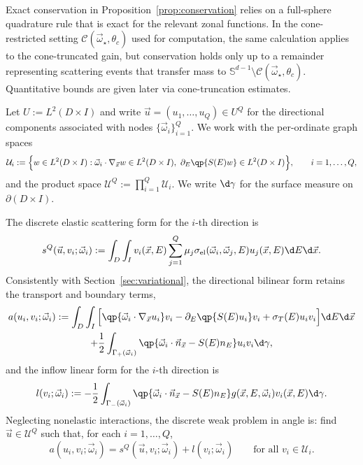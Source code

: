 \documentclass[final]{amsart}
\begin{document}
\begin{remark}
Exact conservation in Proposition~\ref{prop:conservation} relies on a
full-sphere quadrature rule that is exact for the relevant zonal
functions. In the cone-restricted setting
$\mathcal{C}(\vec{\omega}_\star,\theta_c)$ used for computation, the same
calculation applies to the cone-truncated gain, but conservation holds
only up to a remainder representing scattering events that transfer mass
to $\mathbb{S}^{d-1}\setminus\mathcal{C}(\vec{\omega}_\star,\theta_c)$.
Quantitative bounds are given later via cone-truncation estimates.
\end{remark}

Let $U:=L^2(D\times I)$ and write $\vec{u}=(u_1,\dots,u_Q)\in U^Q$ for
the directional components associated with nodes
$\{\vec{\omega}_i\}_{i=1}^Q$. We work with the per-ordinate graph
spaces
\[
  \mathcal{U}_i
  :=
  \Big\{ w\in L^2(D\times I) : 
  \vec{\omega}_i\cdot\nabla_{\vec x} w \in L^2(D\times I),
  \ \partial_E\qp{S(E)w}\in L^2(D\times I)\Big\},
  \qquad i=1,\dots,Q,
\]
and the product space $\mathcal{U}^Q:=\prod_{i=1}^Q \mathcal{U}_i$.
We write $\d\gamma$ for the surface measure on $\partial(D\times I)$.

The discrete elastic scattering form for the $i$-th direction is
\begin{equation}
  \label{eq:sQ-def}
  s^Q(\vec{u},v_i;\vec{\omega}_i)
  :=
  \int_D \int_I
  v_i(\vec{x},E)
  \sum_{j=1}^Q \mu_j 
  \sigma_{\mathrm{el}}(\vec{\omega}_i,\vec{\omega}_j,E) 
  u_j(\vec{x},E)
   \d E \d\vec{x}.
\end{equation}
Consistently with Section~\ref{sec:variational}, the directional
bilinear form retains the transport and boundary terms,
\begin{multline}
  \label{eq:aQ-def}
  a(u_i,v_i;\vec{\omega}_i)
  :=
  \int_D \int_I
  \Big[
    \qp{\vec{\omega}_i\cdot\nabla_{\vec{x}} u_i} v_i
    -
    \partial_E\qp{S(E)u_i} v_i
    +
    \sigma_T(E) u_i v_i
  \Big] \d E \d\vec{x}
  \\
  + \frac{1}{2}\int_{\Gamma_+(\vec{\omega}_i)}
  \qp{\vec{\omega}_i\cdot\vec{n}_{\vec x} - S(E)n_E} u_i v_i \d\gamma,
\end{multline}
and the inflow linear form for the $i$-th direction is
\begin{equation}
  \label{eq:lQ-def}
  l(v_i;\vec{\omega}_i)
  :=
  -\frac{1}{2}\int_{\Gamma_-(\vec{\omega}_i)}
  \qp{\vec{\omega}_i\cdot\vec{n}_{\vec x} - S(E)n_E} 
  g(\vec{x},E,\vec{\omega}_i) v_i(\vec{x},E) \d\gamma.
\end{equation}
Neglecting nonelastic interactions, the discrete weak problem in angle
is: find $\vec{u}\in\mathcal{U}^Q$ such that, for each $i=1,\dots,Q$,
\begin{equation}
  \label{eq:discrete_in_angle}
  a(u_i,v_i;\vec{\omega}_i)
  =
  s^Q(\vec{u},v_i;\vec{\omega}_i)
  +
  l(v_i;\vec{\omega}_i)
  \qquad \text{for all } v_i\in\mathcal{U}_i.
\end{equation}
\end{document}
